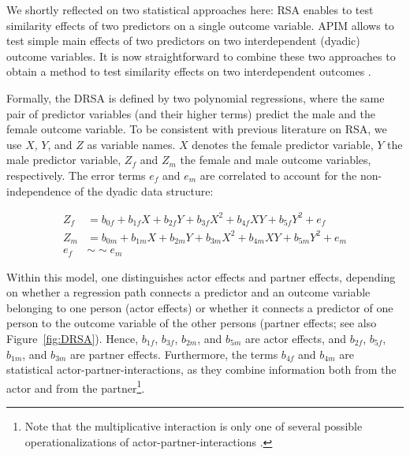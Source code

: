 \documentclass[jou,a4paper,draftfirst]{apa6}
\begin{document}
We shortly reflected on two statistical approaches here: RSA enables to test similarity effects of two predictors on a single outcome variable. APIM allows to test simple main effects of two predictors on two interdependent (dyadic) outcome variables. It is now straightforward to combine these two approaches to obtain a method to test similarity effects on two interdependent outcomes \parencite{NestlerEtAl2015}.

Formally, the DRSA is defined by two polynomial regressions, where the same pair of predictor variables (and their higher terms) predict the male and the female outcome variable. To be consistent with previous literature on RSA, we use $X$, $Y$, and $Z$ as variable names. $X$ denotes the female predictor variable, $Y$ the male predictor variable, $Z_f$ and $Z_m$ the female and male outcome variables, respectively. The error terms $e_f$ and $e_m$ are correlated to account for the non-independence of the dyadic data structure:

\begin{equation} 
\label{eq:dyadic}
\begin{split}
Z_f &= b_{0f} + b_{1f} X + b_{2f} Y + b_{3f} X^2 + b_{4f} X Y + b_{5f} Y^2 + e_f\\
Z_m &= b_{0m} + b_{1m} X + b_{2m} Y + b_{3m} X^2 + b_{4m} X Y + b_{5m} Y^2 + e_m\\
e_f &\sim\sim e_m
\end{split}
\end{equation}

Within this model, one distinguishes actor effects and partner effects, depending on whether a regression path connects a predictor and an outcome variable belonging to one person (actor effects) or whether it connects a predictor of one person to the outcome variable of the other persons (partner effects; see also Figure~\ref{fig:DRSA}). Hence, $b_{1f}$, $b_{3f}$, $b_{2m}$, and $b_{5m}$ are actor effects, and $b_{2f}$, $b_{5f}$, $b_{1m}$, and $b_{3m}$ are partner effects. Furthermore, the terms $b_{4f}$ and $b_{4m}$ are statistical actor-partner-interactions, as they combine information both from the actor and from the partner\footnote{Note that the multiplicative interaction is only one of several possible operationalizations of actor-partner-interactions \parencite{kenny_partner_1999}.}.

\begin{figure*}[ht!]
\centering
{}
\caption{The dyadic RSA path model. Black solid paths are actor effects, dashed paths are partner effects, and the dotted paths are statistical partner interactions. Intercepts are not displayed. Figure available at \url{https://osf.io/ftsrd/}, under a CC-BY4.0 license.}
\label{fig:DRSA}
\end{figure*}
\end{document}

